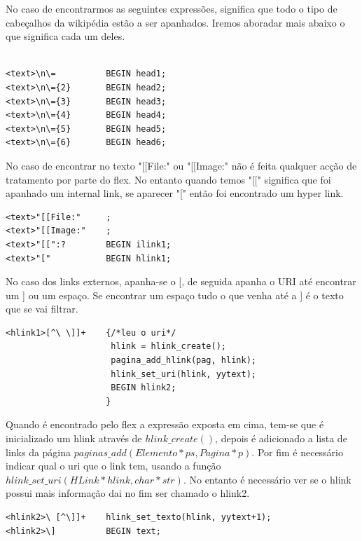 \documentclass[11pt, a4paper, oneside]{article}
\begin{document}
No caso de encontrarmos as seguintes expressões, significa que todo o tipo de cabeçalhos da wikipédia estão a ser apanhados. Iremos aboradar mais abaixo o que significa cada um deles.

\begin{verbatim}

<text>\n\=          BEGIN head1;
<text>\n\={2}       BEGIN head2;
<text>\n\={3}       BEGIN head3;
<text>\n\={4}       BEGIN head4;
<text>\n\={5}       BEGIN head5;
<text>\n\={6}       BEGIN head6;
\end{verbatim}

No caso de encontrar no texto "[[File:" ou "[[Image:" não é feita qualquer acção de tratamento por parte do flex. No entanto quando temos "[[" significa que foi apanhado um internal link, se aparecer "[" então foi encontrado um hyper link.

\begin{verbatim}
<text>"[[File:"     ;
<text>"[[Image:"    ;
<text>"[[":?        BEGIN ilink1;
<text>"["           BEGIN hlink1;
\end{verbatim}

No caso dos links externos, apanha-se o [, de seguida apanha o URI até encontrar um ] ou um espaço. Se encontrar um espaço tudo o que venha até a ]  é o texto que se vai filtrar.
\begin{verbatim}
<hlink1>[^\ \]]+    {/*leu o uri*/
                     hlink = hlink_create();
                     pagina_add_hlink(pag, hlink);
                     hlink_set_uri(hlink, yytext);
                     BEGIN hlink2;
                    }
\end{verbatim}

Quando é  encontrado pelo flex a expressão exposta em cima, tem-se que é inicializado um hlink através de \begin{math} hlink\_create() \end{math}, depois é adicionado a lista de links da página  \begin{math} paginas\_add(Elemento* ps, Pagina* p)\end{math}. Por fim  é necessário indicar qual o uri que o link tem, usando a função  \begin{math} hlink\_set\_uri(HLink* hlink, char* str)\end{math}.
No entanto é necessário ver se o hlink possui mais informação dai no fim ser chamado o hlink2.


\begin{verbatim}
<hlink2>\ [^\]]+    hlink_set_texto(hlink, yytext+1);
<hlink2>\]          BEGIN text;

\end{verbatim}
\end{document}
